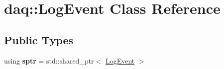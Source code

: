 \hypertarget{classdaq_1_1LogEvent}{}\section{daq\+:\+:Log\+Event Class Reference}
\label{classdaq_1_1LogEvent}
\subsection*{Public Types}
\begin{DoxyCompactItemize}
\item 
\mbox{\label{classdaq_1_1LogEvent_ad02016fc3f4254ead31e411ffa8ffbac}} 
using {\bfseries sptr} = std\+::shared\+\_\+ptr$<$ \hyperlink{classdaq_1_1LogEvent}{Log\+Event} $>$
\end{DoxyCompactItemize}
